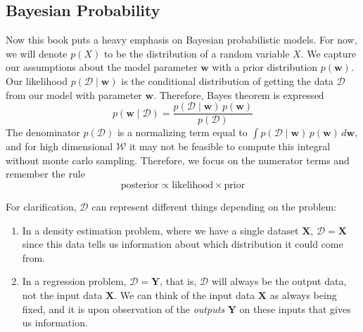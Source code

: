 \documentclass{article}
\theoremstyle{definition}
\begin{document}
\subsection{Bayesian Probability}

Now this book puts a heavy emphasis on Bayesian probabilistic models. For now, we will denote $p(X)$ to be the distribution of a random variable $X$. We capture our assumptions about the model parameter $\mathbf{w}$ with a prior distribution $p(\mathbf{w})$. Our likelihood $p(\mathcal{D} \mid \mathbf{w})$ is the conditional distribution of getting the data $\mathcal{D}$ from our model with parameter $\mathbf{w}$. Therefore, Bayes theorem is expressed 
\[p(\mathbf{w} \mid \mathcal{D}) = \frac{p(\mathcal{D} \mid \mathbf{w}) \, p(\mathbf{w})}{p(\mathcal{D})}\]
The denominator $p(\mathcal{D})$ is a normalizing term equal to $\int p(\mathcal{D} \mid \mathbf{w}) \, p(\mathbf{w}) \,d\mathbf{w}$, and for high dimensional $\mathcal{W}$ it may not be feasible to compute this integral without monte carlo sampling. Therefore, we focus on the numerator terms and remember the rule 
\[\text{posterior} \propto \text{likelihood} \times \text{prior}\]

For clarification, $\mathcal{D}$ can represent different things depending on the problem: 
\begin{enumerate}
    \item In a density estimation problem, where we have a single dataset $\mathbf{X}$, $\mathcal{D} = \mathbf{X}$ since this data tells us information about which distribution it could come from. 
    \item In a regression problem, $\mathcal{D} = \mathbf{Y}$, that is, $\mathcal{D}$ will always be the output data, not the input data $\mathbf{X}$. We can think of the input data $\mathbf{X}$ as always being fixed, and it is upon observation of the \textit{outputs} $\mathbf{Y}$ on these inputs that gives us information. 
\end{enumerate}
\end{document}
